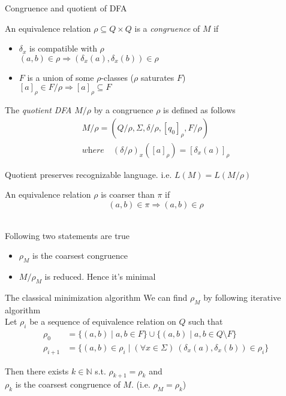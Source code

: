 \documentclass{beamer}
\begin{document}
\begin{frame}[t]{Congruence and quotient of DFA}
   {
    An equivalence relation \(\rho \subseteq Q \times Q\) is a \textit{congruence} of \(M\) if
    \begin{itemize}
      \item \(\delta_x\) is compatible with \(\rho\) \\
            \( (a,b) \in \rho \Rightarrow (\delta_x(a), \delta_x(b)) \in \rho \)
      \item \(F\) is a union of some \(\rho\)-classes (\(\rho\) saturates \(F\)) \\
            \( [a]_\rho \in F/\rho \Rightarrow [a]_\rho \subseteq F \)
    \end{itemize}
  }
   {
    The \textit{quotient DFA} \(M/\rho\) by a congruence \(\rho\) is defined as follows
    \[
      \begin{array}{c}
        M/\rho = (Q/\rho, \Sigma, \delta/\rho, [q_0]_{\rho}, F/\rho) \\
        \textit{where} \quad (\delta/\rho)_x([a]_{\rho}) = [\delta_x(a)]_{\rho}
      \end{array}
    \]
    
    Quotient preserves recognizable language. i.e. \( L(M) = L(M/\rho) \)
  }

   {
    An equivalence relation \(\rho\) is coarser than \(\pi\) if
    \[ (a,b) \in \pi \Rightarrow (a,b) \in \rho \]
  }
   {
    \\ Following two statements are true
    \begin{itemize}
      \item \(\rho_M\) is the coarsest congruence
      \item \(M/\rho_M\) is reduced. Hence it's minimal
    \end{itemize}
  }
\end{frame}

\begin{frame}{The classical minimization algorithm}
  We can find \(\rho_M\) by following iterative algorithm \\[1em]

  Let \(\rho_i\) be a sequence of equivalence relation on \(Q\) such that
  \[
    \begin{array}{ll}
      \rho_0 &= \{ (a,b) \mid a, b \in F \} \cup \{ (a,b) \mid a, b \in Q \setminus F \} \\
      \rho_{i+1} &= \{ (a,b) \in \rho_i \mid (\forall x \in \Sigma) \ (\delta_x(a), \delta_x(b)) \in \rho_i \}
    \end{array}
  \]
  
  \pause
  Then there exists \(k \in \mathbb{N} \) s.t. \(\rho_{k+1} = \rho_k\) and \\
  \(\rho_k\) is the coarsest congruence of \(M\). (i.e. \(\rho_M = \rho_k\))
\end{frame}
\end{document}
